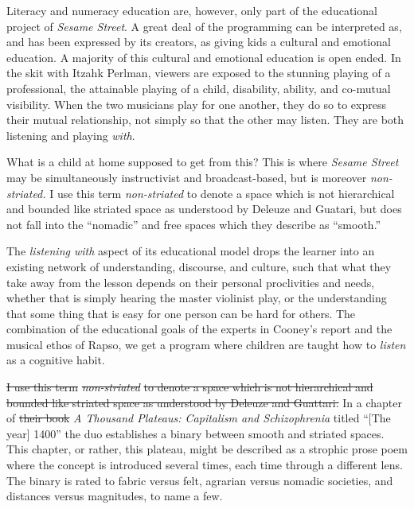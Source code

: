 \documentclass[12pt,letterpaper]{article}
\providecommand{\DIFadd}[1]{{\protect\color{blue}\uwave{#1}}} %
\providecommand{\DIFdel}[1]{{\protect\color{red}\sout{#1}}}                      %
\providecommand{\DIFaddbegin}{} %
\providecommand{\DIFaddend}{} %
\providecommand{\DIFdelbegin}{} %
\providecommand{\DIFdelend}{} %
\newcommand{\DIFscaledelfig}{0.5}
\newlength{\DIFdelgraphicswidth} %
\newlength{\DIFdelgraphicsheight} %
\newcommand{\DIFaddincludegraphics}[2][]{{\color{blue}\fbox{\DIFOincludegraphics[#1]{#2}}}} %
\newcommand{\DIFdelincludegraphics}[2][]{%
\sbox{\DIFdelgraphicsbox}{\DIFOincludegraphics[#1]{#2}}%
\settoboxwidth{\DIFdelgraphicswidth}{\DIFdelgraphicsbox} %
\settoboxtotalheight{\DIFdelgraphicsheight}{\DIFdelgraphicsbox} %
\scalebox{\DIFscaledelfig}{%
\parbox[b]{\DIFdelgraphicswidth}{\usebox{\DIFdelgraphicsbox}\\[-\baselineskip] \rule{\DIFdelgraphicswidth}{0em}}\llap{\resizebox{\DIFdelgraphicswidth}{\DIFdelgraphicsheight}{%
\setlength{\unitlength}{\DIFdelgraphicswidth}%
\begin{picture}(1,1)%
\thicklines\linethickness{2pt} %
{\color[rgb]{1,0,0}\put(0,0){\framebox(1,1){}}}%
{\color[rgb]{1,0,0}\put(0,0){\line( 1,1){1}}}%
{\color[rgb]{1,0,0}\put(0,1){\line(1,-1){1}}}%
\end{picture}%
}\hspace*{3pt}}} %
} %
\DeclareRobustCommand{\DIFaddbegin}{\DIFOaddbegin \let\includegraphics\DIFaddincludegraphics} %
\DeclareRobustCommand{\DIFaddend}{\DIFOaddend \let\includegraphics\DIFOincludegraphics} %
\DeclareRobustCommand{\DIFdelbegin}{\DIFOdelbegin \let\includegraphics\DIFdelincludegraphics} %
\DeclareRobustCommand{\DIFdelend}{\DIFOaddend \let\includegraphics\DIFOincludegraphics} %
\begin{document}
	Literacy and numeracy education are, however, only part of the 
	educational project of \textit{Sesame Street}. A great deal of the 
	programming can be interpreted as, and has been expressed by its 
	creators, as giving kids a cultural and emotional 
	education.\autocite[297]{Ostrofsky2012}
	A majority of this cultural and emotional education is open ended. 
	In the skit with Itzahk Perlman, viewers are exposed to the stunning 
	playing of a professional, the attainable playing of a child, 
	disability, ability, and co-mutual visibility. When the two musicians 
	play for one another, they do so to express their mutual relationship, 
	not simply so that the other may listen. They are both listening and 
	playing \textit{with}. 

	What is a child at home supposed to get from this? This is where 
	\textit{Sesame Street} may be simultaneously instructivist and 
	broadcast-based, but 
	is moreover \textit{non-striated.} I use this term 
	\textit{non-striated} to denote a space which is not
	hierarchical and bounded like striated space as understood by Deleuze 
	and Guatari, but does not fall into the ``nomadic'' and free spaces 
	which they describe as ``smooth.'' 

	The \textit{listening with} aspect of its 
	educational model drops the learner into an existing network of 
	understanding, discourse, and culture, such that what they take away
	from the lesson depends on their personal proclivities and needs, 
	whether that is simply hearing the master violinist play, or the 
	understanding that some thing that is easy for one person can be hard 
	for others. The combination of the educational goals of the experts
	in Cooney's report and the musical ethos of Rapso, we get a program 
	where children are taught how to \textit{listen} as a cognitive habit. 

	\DIFdelbegin \DIFdel{I use this term }\textit{\DIFdel{non-striated}} %
\DIFdel{to denote a space which is not
	hierarchical and bounded like striated space as understood by Deleuze 
	and Guattari. }\DIFdelend In a chapter of \DIFdelbegin \DIFdel{their book }\DIFdelend \DIFaddbegin \DIFadd{Deleuze and Guattari's }\DIFaddend \textit{A Thousand Plateaus: 
	Capitalism and Schizophrenia} titled ``[The year] 1400'' the duo 
	establishes a binary between smooth and striated spaces. This chapter, 
	or rather, this
	plateau, might be described as a strophic prose poem where the concept 
	is introduced several times, each time through a different lens. The 
	binary 
	is rated to fabric versus felt,	agrarian versus nomadic societies, and 
	distances versus magnitudes, to name a few.   
\end{document}
